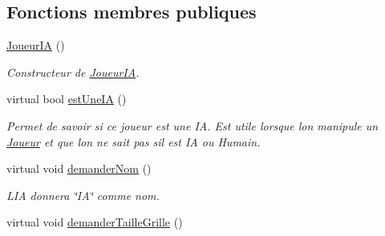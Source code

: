\subsection*{Fonctions membres publiques}
\begin{DoxyCompactItemize}
\item 
\hyperlink{class_joueur_i_a_a88187887d491910b2e7e969fb9ea4188}{Joueur\+IA} ()\hypertarget{class_joueur_i_a_a88187887d491910b2e7e969fb9ea4188}{}\label{class_joueur_i_a_a88187887d491910b2e7e969fb9ea4188}

\begin{DoxyCompactList}\small\item\em Constructeur de \hyperlink{class_joueur_i_a}{Joueur\+IA}. \end{DoxyCompactList}\item 
virtual bool \hyperlink{class_joueur_i_a_a549e94b2b4673dcf97041add34bc49a0}{est\+Une\+IA} ()
\begin{DoxyCompactList}\small\item\em Permet de savoir si ce joueur est une IA. Est utile lorsque l\textquotesingle{}on manipule un \hyperlink{class_joueur}{Joueur} et que l\textquotesingle{}on ne sait pas s\textquotesingle{}il est IA ou Humain. \end{DoxyCompactList}\item 
virtual void \hyperlink{class_joueur_i_a_ac61e1573c44426a797fcd826ad21e03c}{demander\+Nom} ()\hypertarget{class_joueur_i_a_ac61e1573c44426a797fcd826ad21e03c}{}\label{class_joueur_i_a_ac61e1573c44426a797fcd826ad21e03c}

\begin{DoxyCompactList}\small\item\em L\textquotesingle{}IA donnera \char`\"{}\+I\+A\char`\"{} comme nom. \end{DoxyCompactList}\item 
virtual void \hyperlink{class_joueur_i_a_a073f19ae34a403f4d3bd70e5e82347a0}{demander\+Taille\+Grille} ()\hypertarget{class_joueur_i_a_a073f19ae34a403f4d3bd70e5e82347a0}{}\label{class_joueur_i_a_a073f19ae34a403f4d3bd70e5e82347a0}


\end{DoxyCompactItemize}
